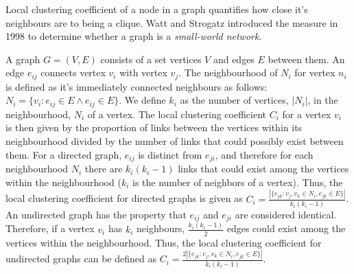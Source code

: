 \documentclass{article}
\begin{document}

Local clustering coefficient of a node in a graph quantifies how close it's neighbours are to being a clique. Watt and Strogatz introduced the measure in 1998 to determine whether a graph is a {\textit{small-world network}}.

A graph $G=(V,E)$ consists of a set vertices $V$ and edges $E$ between them. An edge $e_{ij}$ connects vertex $v_{i}$ with vertex $v_{j}$. The neighbourhood of $N_{i}$ for vertex $n_{i}$ is defined as it's immediately connected neighbours as follows: $N_{i}=\{v_{i}:e_{ij} \in E \land e_{ij} \in E \} $. We define $k_{i}$ as the number of vertices, $|N_{i}|$, in the neighbourhood, $N_{i}$ of a vertex.
The local clustering coefficient $C_{i}$ for a vertex $v_{i}$ is then given by the proportion of links between the vertices within its neighbourhood divided by the number of links that could possibly exist between them. For a directed graph, $e_{ij}$ is distinct from $e_{ji}$, and therefore for each neighbourhood $N_{i}$ there are $k_{i}(k_{i}-1)$ links that could exist among the vertices within the neighbourhood ($k_{i}$ is the number of neighbors of a vertex). Thus, the local clustering coefficient for directed graphs is given as $C_{i} = \frac{|\{e_{jk}: v_{j},v_{k} \in N_{i}, e_{jk} \in E\}|}{k_{i}(k_i-1)}$.
An undirected graph has the property that $e_{ij}$ and $e_{ji}$ are considered identical. Therefore, if a vertex $v_{i}$ has $k_{i}$ neighbours, $\frac{k_i(k_i-1)}{2}$ edges could exist among the vertices within the neighbourhood. Thus, the local clustering coefficient for undirected graphs can be defined as
$C_{i} = \frac{2|\{e_{jk}: v_{j},v_{k} \in N_{i}, e_{jk} \in E\}|}{k_{i}(k_{i}-1)}$.
\end{document}
